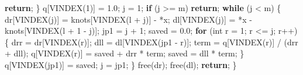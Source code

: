 \documentclass[
  12pt,
  letterpaper,
  DIV=11,
  numbers=noendperiod]{scrreprt}
\newenvironment{Shaded}{\begin{snugshade}}{\end{snugshade}}
\newcommand{\ControlFlowTok}[1]{\textcolor[rgb]{0.00,0.23,0.31}{\textbf{#1}}}
\newcommand{\DataTypeTok}[1]{\textcolor[rgb]{0.68,0.00,0.00}{#1}}
\newcommand{\DecValTok}[1]{\textcolor[rgb]{0.68,0.00,0.00}{#1}}
\newcommand{\FloatTok}[1]{\textcolor[rgb]{0.68,0.00,0.00}{#1}}
\newcommand{\NormalTok}[1]{\textcolor[rgb]{0.00,0.23,0.31}{#1}}
\newcommand{\OperatorTok}[1]{\textcolor[rgb]{0.37,0.37,0.37}{#1}}
\theoremstyle{remark}
\begin{document}
\begin{Shaded}
\begin{Highlighting}[]
        \ControlFlowTok{return}\OperatorTok{;}
    \OperatorTok{\}}
\NormalTok{    q}\OperatorTok{[}\NormalTok{VINDEX}\OperatorTok{(}\DecValTok{1}\OperatorTok{)]} \OperatorTok{=} \FloatTok{1.0}\OperatorTok{;}
\NormalTok{    j }\OperatorTok{=} \DecValTok{1}\OperatorTok{;}
    \ControlFlowTok{if} \OperatorTok{(}\NormalTok{j }\OperatorTok{\textgreater{}=}\NormalTok{ m}\OperatorTok{)} \ControlFlowTok{return}\OperatorTok{;}
    \ControlFlowTok{while} \OperatorTok{(}\NormalTok{j }\OperatorTok{\textless{}}\NormalTok{ m}\OperatorTok{)} \OperatorTok{\{}
\NormalTok{        dr}\OperatorTok{[}\NormalTok{VINDEX}\OperatorTok{(}\NormalTok{j}\OperatorTok{)]} \OperatorTok{=}\NormalTok{ knots}\OperatorTok{[}\NormalTok{VINDEX}\OperatorTok{(}\NormalTok{l }\OperatorTok{+}\NormalTok{ j}\OperatorTok{)]} \OperatorTok{{-}} \OperatorTok{*}\NormalTok{x}\OperatorTok{;}
\NormalTok{        dl}\OperatorTok{[}\NormalTok{VINDEX}\OperatorTok{(}\NormalTok{j}\OperatorTok{)]} \OperatorTok{=} \OperatorTok{*}\NormalTok{x }\OperatorTok{{-}}\NormalTok{ knots}\OperatorTok{[}\NormalTok{VINDEX}\OperatorTok{(}\NormalTok{l }\OperatorTok{+} \DecValTok{1} \OperatorTok{{-}}\NormalTok{ j}\OperatorTok{)];}
\NormalTok{        jp1 }\OperatorTok{=}\NormalTok{ j }\OperatorTok{+} \DecValTok{1}\OperatorTok{;}
\NormalTok{        saved }\OperatorTok{=} \FloatTok{0.0}\OperatorTok{;}
        \ControlFlowTok{for} \OperatorTok{(}\DataTypeTok{int}\NormalTok{ r }\OperatorTok{=} \DecValTok{1}\OperatorTok{;}\NormalTok{ r }\OperatorTok{\textless{}=}\NormalTok{ j}\OperatorTok{;}\NormalTok{ r}\OperatorTok{++)} \OperatorTok{\{}
\NormalTok{            drr }\OperatorTok{=}\NormalTok{ dr}\OperatorTok{[}\NormalTok{VINDEX}\OperatorTok{(}\NormalTok{r}\OperatorTok{)];}
\NormalTok{            dll }\OperatorTok{=}\NormalTok{ dl}\OperatorTok{[}\NormalTok{VINDEX}\OperatorTok{(}\NormalTok{jp1 }\OperatorTok{{-}}\NormalTok{ r}\OperatorTok{)];}
\NormalTok{            term }\OperatorTok{=}\NormalTok{ q}\OperatorTok{[}\NormalTok{VINDEX}\OperatorTok{(}\NormalTok{r}\OperatorTok{)]} \OperatorTok{/} \OperatorTok{(}\NormalTok{drr }\OperatorTok{+}\NormalTok{ dll}\OperatorTok{);}
\NormalTok{            q}\OperatorTok{[}\NormalTok{VINDEX}\OperatorTok{(}\NormalTok{r}\OperatorTok{)]} \OperatorTok{=}\NormalTok{ saved }\OperatorTok{+}\NormalTok{ drr }\OperatorTok{*}\NormalTok{ term}\OperatorTok{;}
\NormalTok{            saved }\OperatorTok{=}\NormalTok{ dll }\OperatorTok{*}\NormalTok{ term}\OperatorTok{;}
        \OperatorTok{\}}
\NormalTok{        q}\OperatorTok{[}\NormalTok{VINDEX}\OperatorTok{(}\NormalTok{jp1}\OperatorTok{)]} \OperatorTok{=}\NormalTok{ saved}\OperatorTok{;}
\NormalTok{        j }\OperatorTok{=}\NormalTok{ jp1}\OperatorTok{;}
    \OperatorTok{\}}
\NormalTok{    free}\OperatorTok{(}\NormalTok{dr}\OperatorTok{);}
\NormalTok{    free}\OperatorTok{(}\NormalTok{dl}\OperatorTok{);}
    \ControlFlowTok{return}\OperatorTok{;}
\OperatorTok{\}}


\end{Highlighting}
\end{Shaded}
\end{document}
